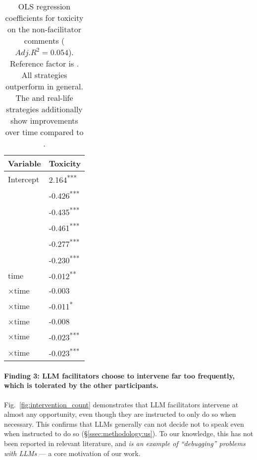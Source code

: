 \begin{table}[t]
	\centering
	\begin{tabular}{p{5cm} p{1.5cm}}
		\toprule
		\textbf{Variable} & \textbf{Toxicity} \\
		\midrule
		Intercept & 2.164\textsuperscript{***} \\
		\strategynoinstr & -0.426\textsuperscript{***} \\
		\strategymodgame & -0.435\textsuperscript{***} \\
		\strategyrules & -0.461\textsuperscript{***} \\
		\strategyregroom & -0.277\textsuperscript{***} \\
		\strategyconstrcomm & -0.230\textsuperscript{***} \\
		time & -0.012\textsuperscript{**} \\
		\strategynoinstr$\times$time & -0.003 \\
		\strategymodgame$\times$time & -0.011\textsuperscript{*} \\
		\strategyrules$\times$time & -0.008 \\
		\strategyregroom$\times$time & -0.023\textsuperscript{***} \\
		\strategyconstrcomm$\times$time & -0.023\textsuperscript{***} \\
		\bottomrule
	\end{tabular}
	\small
	\asterisknote
	\normalsize
	\caption{OLS regression coefficients for toxicity on the non-facilitator comments ($Adj. R^2=0.054$). Reference factor is \textit{\strategynomod}. All strategies outperform \textit{\strategynomod} in general. The \textit{\strategyregroom} and \textit{\strategyconstrcomm} real-life strategies additionally show improvements over time compared to \textit{\strategynoinstr}.}
	\label{tab:toxicity}
\end{table}


\paragraph{Finding 3: LLM facilitators choose to intervene far too frequently, which is tolerated by the other participants.} Fig.~\ref{fig:intervention_count} demonstrates that LLM facilitators intervene at almost any opportunity, even though they are instructed to only do so when necessary. This confirms that LLMs generally can not decide not to speak even when instructed to do so  (\S\ref{ssec:methodology:us}). To our knowledge, this has not been reported in relevant literature, and \emph{is an example of ``debugging'' problems with LLMs} --- a core motivation of our work.

